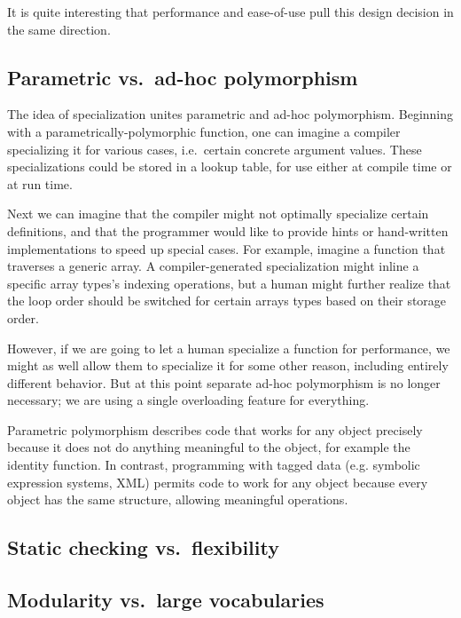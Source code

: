 It is quite interesting that performance and ease-of-use pull this design
decision in the same direction.

\subsection{Parametric vs.\  ad-hoc polymorphism}


The idea of specialization unites parametric and ad-hoc polymorphism.
Beginning with a parametrically-polymorphic function, one can imagine
a compiler specializing it for various cases, i.e.\ certain concrete argument
values. These specializations could be stored in a lookup table, for use
either at compile time or at run time.

Next we can imagine that the compiler might not optimally specialize
certain definitions, and that the programmer would like to provide
hints or hand-written implementations to speed up special cases.
For example, imagine a function that traverses a generic array. A compiler-generated
specialization might inline a specific array types's indexing operations, but a human
might further realize that the loop order should be switched for certain
arrays types based on their storage order.

However, if we are going to let a human specialize a function for performance,
we might as well allow them to specialize it for some other reason, including
entirely different behavior. But at this point separate ad-hoc polymorphism
is no longer necessary; we are using a single overloading feature for
everything.


Parametric polymorphism describes code that works for any object precisely
because it does not do anything meaningful to the object, for example the
identity function. In contrast, programming with tagged data (e.g.
symbolic expression systems, XML) permits code to work for any object
because every object has the same structure, allowing meaningful
operations.

\subsection{Static checking vs.\ flexibility}

\subsection{Modularity vs.\ large vocabularies}

